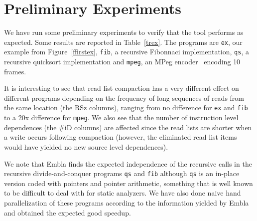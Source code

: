 \documentclass[times, 10pt,twocolumn]{article}
\begin{document}
\section{Preliminary Experiments}

We have run some preliminary experiments to verify that the tool performs as
expected. Some results are reported in Table~\ref{trex}. The programs are 
{\tt ex}, our example from Figure~\ref{ffirstex}, {\tt fib}, a recursive
Fibonnaci implementation, {\tt qs}, a recursive quicksort implementation 
and {\tt mpeg}, an MPeg encoder~\cite{MPEG} encoding 10 frames.

It is interesting
to see that read list compaction has a very different effect on different 
programs depending on the frequency of long sequences of reads from the same 
location (the RSz columns), ranging from no difference for {\tt ex} and 
{\tt fib} to a 20x difference for {\tt mpeg}. We also see that the number of 
instruction 
level dependences (the \#iD columns) are affected since the read lists 
are shorter when a write occurs following compaction (however, the 
eliminated read list 
items would have yielded no new source level dependences).

We note that Embla finds the expected independence of the recursive calls 
in the recursive divide-and-conquer programs {\tt qs} and
{\tt fib} although {\tt qs} is an in-place version coded 
with pointers and pointer arithmetic, something that is well known to be 
difficult to deal with for static analyzers. We have also done naive
hand parallelization of these programs according to the information 
yielded by Embla and obtained the expected good speedup.
\end{document}
